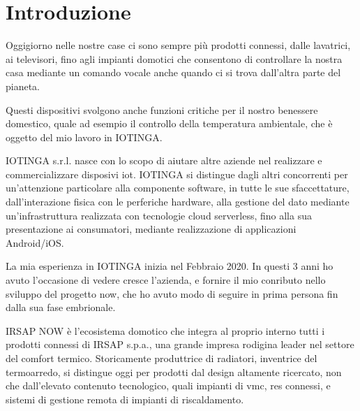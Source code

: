 \documentclass[12pt,a4paper,twoside,titlepage]{book}
\begin{document}
\frontmatter

\begin{frontespizio}
\end{frontespizio}

\tableofcontents

\mainmatter


\chapter{Introduzione}

Oggigiorno nelle nostre case ci sono sempre più prodotti connessi,
dalle lavatrici, ai televisori, fino agli impianti domotici che
consentono di controllare la nostra casa mediante un comando vocale
anche quando ci si trova dall'altra parte del pianeta.

Questi dispositivi svolgono anche funzioni critiche per il nostro
benessere domestico, quale ad esempio il controllo della temperatura
ambientale, che è oggetto del mio lavoro in IOTINGA.

IOTINGA s.r.l. nasce con lo scopo di aiutare altre aziende nel realizzare e
commercializzare disposivi \Gls{iot}. IOTINGA si distingue dagli altri
concorrenti per un'attenzione particolare alla componente software,
in tutte le sue sfaccettature, dall'interazione fisica con le perferiche
hardware, alla gestione del dato mediante un'infrastruttura realizzata
con tecnologie \gls{cloud} \gls{serverless}, fino alla sua presentazione ai consumatori,
mediante realizzazione di applicazioni Android/iOS.

La mia esperienza in IOTINGA inizia nel Febbraio 2020. In questi 3 anni
ho avuto l'occasione di vedere cresce l'azienda, e fornire il mio conributo
nello sviluppo del progetto \Gls{now}, che ho avuto modo di seguire
in prima persona fin dalla sua fase embrionale.

IRSAP NOW è l'ecosistema domotico che integra al proprio interno tutti
i prodotti connessi di IRSAP s.p.a., una grande impresa rodigina leader
nel settore del comfort termico. Storicamente produttrice di radiatori,
inventrice del termoarredo, si distingue oggi per prodotti dal design altamente
ricercato, non che dall'elevato contenuto tecnologico, quali impianti di \Gls{vmc},
\glspl{re} connessi, e sistemi di gestione remota di impianti di riscaldamento.
\end{document}
